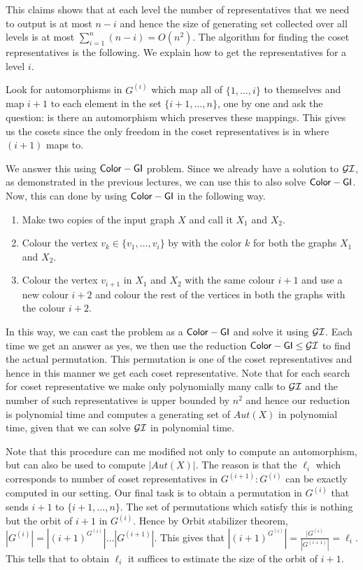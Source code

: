 This claims shows that at each level the number of representatives that we
need to output is at most $n-i$ and hence the size of generating set collected
over all levels is at most $\sum_{i=1}^n (n-i) = O(n^2)$.
The algorithm for finding the coset representatives is the following. We
explain how to get the representatives for a level $i$.

Look for automorphisms in $G^{(i)}$ which map all of $\{1, \ldots, i\}$ to
themselves and map $i+1$ to each element in the set $\{i+1, \ldots,n\}$, one
by one and ask the question: is there an automorphism which preserves these
mappings. This gives us the cosets since the only freedom in the coset
representatives is in where $(i+1)$ maps to. 

We answer this using ${\sf Color-GI}$ problem. Since we already have a solution to
$\mathcal{GI}$, as demonstrated in the previous lectures, we can use this to also 
solve ${\sf Color-GI}$. Now, this can done by using ${\sf Color-GI}$ in the following way. 

\begin{enumerate}
	\item Make two copies of the input graph $X$ and call it $X_1$ and
		$X_2$.
	\item Colour the vertex  $v_k \in \{v_1, \ldots, v_i\}$ by  with the
		color $k$ for both the graphs $X_1$ and $X_2$. 
	\item Colour the vertex $v_{i+1}$ in $X_1$ and $X_2$ with the same
		colour $i+1$ and use a new colour $i+2$ and colour the rest of 
		the vertices in both the graphs with the colour $i+2$.
\end{enumerate}

In this way, we can cast the problem as a ${\sf Color-GI}$ and solve it using
$\cal{GI}$. Each time we get an answer as yes, we then use the reduction
${\sf Color-GI} \le \mathcal{GI}$ to find the actual permutation. This
permutation is one of the coset representatives and hence in this manner we
get each coset representative. Note that for each search for coset
representative we make only polynomially many calls to $\cal{GI}$ and the
number of such representatives is upper bounded by $n^2$ and hence our
reduction is polynomial time and computes a generating set of $Aut(X)$ in
polynomial time, given that we can solve $\cal{GI}$ in polynomial time.

Note that this procedure can me modified not only to compute an automorphism,
but can also be used to compute $|Aut(X)|$. The reason is that the $\ell_i$
which corresponds to number of coset representatives in $G^{(i+1)}:G^{(i)}$
can be exactly computed in our setting. Our final task is to obtain a
permutation in $G^{(i)}$ that sends $i+1$ to $\{i+1,\ldots,n\}$. The set of
permutations which satisfy this is nothing but the orbit of $i+1$ in
$G^{(i)}$. Hence by Orbit stabilizer theorem, $|G^{(i)}| = \left
|(i+1)^{G^{(i)}} \right |\ldots |G^{(i+1)}|$. This gives that $\left |
(i+1)^{G^{(i)}} \right | = \frac{|G^{(i)}}{|G^{(i+1)}|} = \ell_i$. This tells
that to obtain $\ell_i$ it suffices to estimate the size of the orbit of
$i+1$.

